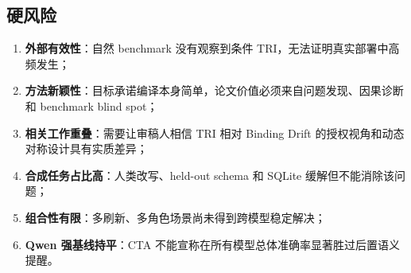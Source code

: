 \documentclass[10pt,fontset=none]{ctexart}
\begin{document}
\subsection{硬风险}
\begin{enumerate}
\item \textbf{外部有效性}：自然 benchmark 没有观察到条件 TRI，无法证明真实部署中高频发生；
\item \textbf{方法新颖性}：目标承诺编译本身简单，论文价值必须来自问题发现、因果诊断和 benchmark blind spot；
\item \textbf{相关工作重叠}：需要让审稿人相信 TRI 相对 Binding Drift 的授权视角和动态对称设计具有实质差异；
\item \textbf{合成任务占比高}：人类改写、held-out schema 和 SQLite 缓解但不能消除该问题；
\item \textbf{组合性有限}：多刷新、多角色场景尚未得到跨模型稳定解决；
\item \textbf{Qwen 强基线持平}：CTA 不能宣称在所有模型总体准确率显著胜过后置语义提醒。
\end{enumerate}
\end{document}
